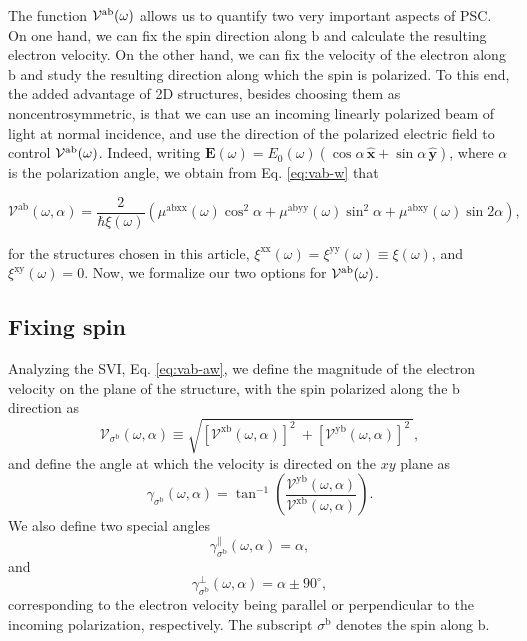 \documentclass[floatfix,prb,aps,superscriptaddress,showpacs,11pt,preprint,letterpaper]{revtex4}
\begin{document}
The function ${\cal V}^{\mathrm{a}\mathrm{b}}(\omega)$ allows us to quantify two
very important aspects of PSC. On one hand, we can fix the spin direction along
$\mathrm{b}$ and calculate the resulting electron velocity. On the other hand,
we can fix the velocity of the electron along $\mathrm{b}$ and study the
resulting direction along which the spin is polarized. To this end, the added
advantage of  2D structures, besides choosing them as noncentrosymmetric, is
that we can use an incoming linearly polarized beam of light at normal
incidence, and use the  direction of the polarized  electric field to control
${\cal V}^{\mathrm{a}\mathrm{b}}(\omega)$. Indeed, writing ${\mathbf E}(\omega)
= E_0(\omega)(\cos\alpha\,\hat{\mathbf x}+\sin\alpha\,\hat{\mathbf y})$, where
$\alpha$ is the polarization angle, we obtain from Eq. \eqref{eq:vab-w} that
\begin{widetext}
\begin{equation}
\mathcal{V}^{\mathrm{ab}}(\omega,\alpha) = 
\frac{2}{\hbar\xi(\omega)}
\left(\mu^{\mathrm{abxx}}(\omega)\cos^{2}\alpha + 
\mu^{\mathrm{abyy}}(\omega)\sin^{2}\alpha + 
\mu^{\mathrm{abxy}}(\omega)\sin 2\alpha\right)
,
\label{eq:vab-aw}
\end{equation}
\end{widetext}
for the structures chosen in this article, $\xi^{\mathrm{xx}}(\omega) =
\xi^{\mathrm{yy}}(\omega)\equiv\xi(\omega)$, and $\xi^{\mathrm{xy}}(\omega)=0$.
Now, we formalize our two options for ${\cal V}^{\mathrm{a}\mathrm{b}}(\omega)$.

\subsection{Fixing spin}\label{sec:theory-fixspin}

Analyzing the SVI, Eq. \eqref{eq:vab-aw}, we define the magnitude of the
electron velocity on the plane of the structure, with the spin polarized along
the $\mathrm{b}$ direction as
\begin{equation}
\mathcal{V}_{\sigma^{\mathrm{b}}}(\omega,\alpha) \equiv
\sqrt{
[\mathcal{V}^{\mathrm{xb}}(\omega,\alpha)]^{2}\ +
[\mathcal{V}^{\mathrm{yb}}(\omega,\alpha)]^{2}\ 
}, 
\label{eq:vs-mag}
\end{equation}
and define the angle at which the velocity is directed on the $xy$ plane as
\begin{equation}
\gamma_{\sigma^\mathrm{b}} (\omega,\alpha) =
\tan^{-1} \left( \frac{\mathcal{V}^{\mathrm{yb}}(\omega,\alpha)}
{\mathcal{V}^{\mathrm{xb}}(\omega,\alpha)} \right)
.
\label{eq:gamma-ang}
\end{equation}
We also define two special angles
\begin{equation}
\gamma_{\sigma^\mathrm{b}}^\parallel(\omega,\alpha) = \alpha, 
\label{eq:gamma-par} 
\end{equation}
and
\begin{equation}
\gamma_{\sigma^\mathrm{b}}^\perp(\omega,\alpha) = \alpha \pm 90^{\circ},
\label{eq:gamma-perp}
\end{equation}
corresponding to the electron velocity being parallel or perpendicular to the
incoming polarization, respectively. The subscript $\sigma^\mathrm{b}$ denotes
the spin along $\mathrm{b}$.
\end{document}
